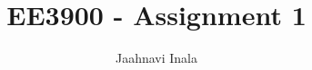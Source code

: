 \documentclass[journal,12pt,twocolumn]{IEEEtran}
\begin{document}

\def\putbox#1#2#3{\makebox[0in][l]{\makebox[#1][l]{}\raisebox{\baselineskip}[0in][0in]{\raisebox{#2}[0in][0in]{#3}}}}
     \def\rightbox#1{\makebox[0in][r]{#1}}
     \def\centbox#1{\makebox[0in]{#1}}
     \def\topbox#1{\raisebox{-\baselineskip}[0in][0in]{#1}}
     \def\midbox#1{\raisebox{-0.5\baselineskip}[0in][0in]{#1}}

\vspace{3cm}

\title{ 
EE3900 - Assignment 1%
}


%
%
%

\author{ Jaahnavi Inala%
}
% 
%
\end{document}
